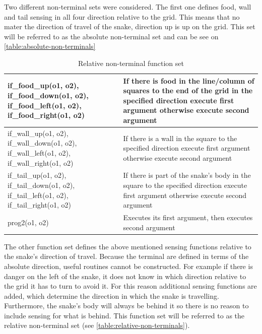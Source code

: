 \documentclass[12pt,a4paper]{article}
\begin{document}
	Two different non-terminal sets were considered. The first one defines food, wall and tail sensing in all four direction relative to the grid. This means that no mater the direction of travel of the snake, direction up is up on the grid.	This set will be referred to as the absolute non-terminal set and can be see on \autoref{table:absolute-non-terminals}
	
	\begin{table}[h!]
		\centering
		\begin{tabu} to \textwidth {|X[3,l]|X[5,l]|}
			\hline
			if\_food\_up(o1, o2), if\_food\_down(o1, o2), if\_food\_left(o1, o2), if\_food\_right(o1, o2) & If there is food in the line/column of squares to the end of the grid in the specified direction execute first argument otherwise execute second argument\\  
			\hline
			
			if\_wall\_up(o1, o2), if\_wall\_down(o1, o2), if\_wall\_left(o1, o2), if\_wall\_right(o1, o2) & If there is a wall in the square to the specified direction execute first argument otherwise execute second argument\\  
			\hline
			
			if\_tail\_up(o1, o2), if\_tail\_down(o1, o2), if\_tail\_left(o1, o2), if\_tail\_right(o1, o2) & If there is part of the snake's body in the square to the specified direction execute first argument otherwise execute second argument\\  
			\hline
			
			prog2(o1, o2) & Executes its first argument, then executes second argument \\   
			\hline
		\end{tabu}
		
		\caption{Relative non-terminal function set}
		\label{table:relative-non-terminals}
	\end{table}
	
	The other function set defines the above mentioned sensing functions relative to the snake's direction of travel. Because the terminal are defined in terms of the absolute direction, useful routines cannot be constructed. For example if there is danger on the left of the snake, it does not know in which direction relative to the grid it has to turn to avoid it. For this reason additional sensing functions are added, which determine the direction in which the snake is travelling. Furthermore, the snake's body will always be behind it so there is no reason to include sensing for what is behind. This function set will be referred to as the relative non-terminal set (see \autoref{table:relative-non-terminals}).
	
\end{document}
